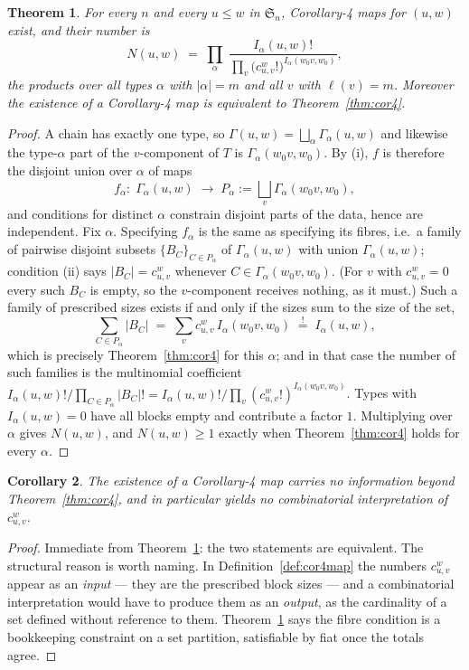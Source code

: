 \documentclass[11pt]{article}
\theoremstyle{plain}
\newtheorem{theorem}{Theorem}
\newtheorem{corollary}[theorem]{Corollary}
\theoremstyle{definition}
\newcommand{\Gam}{\Gamma}
\newcommand{\wo}{w_0}
\newcommand{\Sn}{\mathfrak{S}_n}
\begin{document}
\begin{theorem}\label{thm:A}
For every $n$ and every $u\le w$ in $\Sn$, Corollary-4 maps for $(u,w)$ exist,
and their number is
\[
  N(u,w)\;=\;\prod_{\alpha}\;
  \frac{I_\alpha(u,w)!}{\displaystyle\prod_{v}\bigl(c^w_{u,v}!\bigr)^{I_\alpha(\wo v,\wo)}},
\]
the products over all types $\alpha$ with $|\alpha|=m$ and all $v$ with
$\ell(v)=m$.  Moreover the existence of a Corollary-4 map is \emph{equivalent} to
Theorem~\ref{thm:cor4}.
\end{theorem}

\begin{proof}
A chain has exactly one type, so $\Gam(u,w)=\bigsqcup_\alpha\Gam_\alpha(u,w)$ and
likewise the type-$\alpha$ part of the $v$-component of $T$ is
$\Gam_\alpha(\wo v,\wo)$.  By (i), $f$ is therefore the disjoint union over
$\alpha$ of maps
\[
  f_\alpha:\;\Gam_\alpha(u,w)\;\longrightarrow\;
  P_\alpha:=\bigsqcup_{v}\Gam_\alpha(\wo v,\wo),
\]
and conditions for distinct $\alpha$ constrain disjoint parts of the data, hence
are independent.  Fix $\alpha$.  Specifying $f_\alpha$ is the same as specifying
its fibres, i.e.\ a family of pairwise disjoint subsets
$\{B_C\}_{C\in P_\alpha}$ of $\Gam_\alpha(u,w)$ with union
$\Gam_\alpha(u,w)$; condition (ii) says $|B_C|=c^w_{u,v}$ whenever
$C\in\Gam_\alpha(\wo v,\wo)$.  (For $v$ with $c^w_{u,v}=0$ every such $B_C$ is
empty, so the $v$-component receives nothing, as it must.)  Such a family of
prescribed sizes exists if and only if the sizes sum to the size of the set,
\[
  \sum_{C\in P_\alpha}|B_C|
  \;=\;\sum_{v} c^w_{u,v}\,I_\alpha(\wo v,\wo)
  \;\overset{!}{=}\;I_\alpha(u,w),
\]
which is precisely Theorem~\ref{thm:cor4} for this $\alpha$; and in that case the
number of such families is the multinomial coefficient
$I_\alpha(u,w)!\big/\prod_{C\in P_\alpha}|B_C|!
 = I_\alpha(u,w)!\big/\prod_v (c^w_{u,v}!)^{I_\alpha(\wo v,\wo)}$.
Types with $I_\alpha(u,w)=0$ have all blocks empty and contribute a factor $1$.
Multiplying over $\alpha$ gives $N(u,w)$, and $N(u,w)\ge1$ exactly when
Theorem~\ref{thm:cor4} holds for every $\alpha$.
\end{proof}

\begin{corollary}\label{cor:A}
The existence of a Corollary-4 map carries no information beyond
Theorem~\ref{thm:cor4}, and in particular yields no combinatorial
interpretation of $c^w_{u,v}$.
\end{corollary}

\begin{proof}
Immediate from Theorem~\ref{thm:A}: the two statements are equivalent.  The
structural reason is worth naming.  In Definition~\ref{def:cor4map} the numbers
$c^w_{u,v}$ appear as an \emph{input} --- they are the prescribed block sizes ---
and a combinatorial interpretation would have to produce them as an
\emph{output}, as the cardinality of a set defined without reference to them.
Theorem~\ref{thm:A} says the fibre condition is a bookkeeping constraint on a set
partition, satisfiable by fiat once the totals agree.
\end{proof}
\end{document}
